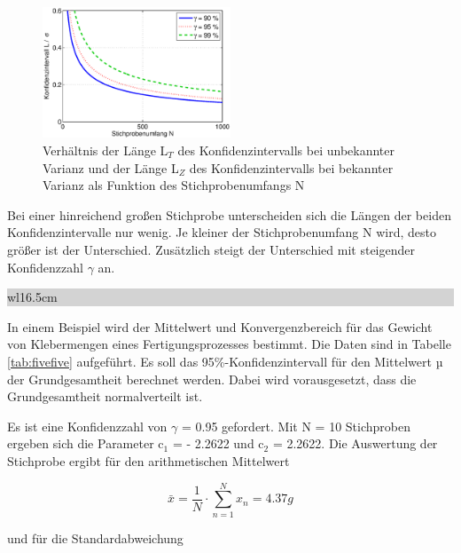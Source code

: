 \noindent 
\begin{figure}[H]
  \centerline{\includegraphics[width=0.5\textwidth]{Kapitel5/Bilder/image8}}
  \caption{Verh\"{a}ltnis der L\"{a}nge L${}_{T}$ des Konfidenzintervalls bei unbekannter Varianz und der L\"{a}nge L${}_{Z}$ des Konfidenzintervalls bei bekannter Varianz als Funktion des Stichprobenumfangs N}
  \label{fig:Konfidenzintervall3}
\end{figure}

\noindent Bei einer hinreichend gro{\ss}en Stichprobe unterscheiden sich die L\"{a}ngen der beiden Konfidenzintervalle nur wenig. Je kleiner der Stichprobenumfang N wird, desto gr\"{o}{\ss}er ist der Unterschied. Zus\"{a}tzlich steigt der Unterschied mit steigender Konfidenzzahl $\gamma$ an. \bigskip

\noindent
\colorbox{lightgray}{%
%
\renewcommand\arraystretch{0.6}%
\begin{tabular}{ wl{16.5cm} }
{\selectfont
{}}
\end{tabular}%
}\medskip

\noindent In einem Beispiel wird der Mittelwert und Konvergenzbereich f\"{u}r das Gewicht von Klebermengen eines Fertigungsprozesses bestimmt. Die Daten sind in Tabelle \ref{tab:fivefive} aufgef\"{u}hrt. Es soll das 95\%-Konfidenzintervall f\"{u}r den Mittelwert µ der Grundgesamtheit berechnet werden. Dabei wird vorausgesetzt, dass die Grundgesamtheit normalverteilt ist.

\noindent Es ist eine Konfidenzzahl von $\gamma$ = 0.95 gefordert. Mit N = 10 Stichproben ergeben sich die Parameter c$_{1}$ = - 2.2622 und c$_{2}$ = 2.2622. Die Auswertung der Stichprobe ergibt f\"{u}r den arithmetischen Mittelwert

\begin{equation}\label{eq:fivefiftyseven}
\bar{x}=\dfrac{1}{N} \cdot \sum _{n=1}^{N}x_{n}  =4.37 g
\end{equation}

\noindent und f\"{u}r die Standardabweichung

